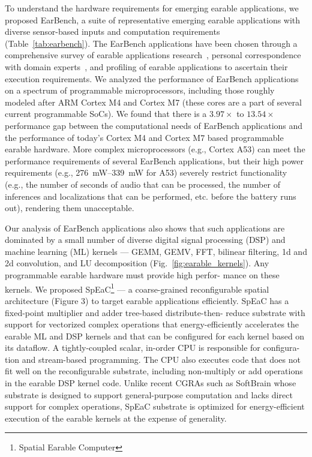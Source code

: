 To understand the hardware requirements for emerging earable applications, we
proposed EarBench, a suite of representative emerging earable applications with
diverse sensor-based inputs and computation requirements
(Table~\ref{tab:earbench}). The EarBench applications have been chosen through
a comprehensive survey of earable applications research~\cite{}, personal
correspondence with domain experts~\cite{}, and profiling of earable
applications to ascertain their execution requirements. We analyzed the
performance of EarBench applications on a spectrum of programmable
microprocessors, including those roughly modeled after ARM Cortex M4 and Cortex
M7 (these cores are a part of several current programmable SoCs). We found that
there is a \(3.97\times\) to \(13.54\times\) performance gap between the
computational needs of EarBench applications and the performance of today's
Cortex M4 and Cortex M7 based programmable earable hardware. More complex
microprocessors (e.g., Cortex A53) can meet the performance requirements of
several EarBench applications, but their high power requirements (e.g.,
\SIrange{276}{339}{\milli\watt} for A53) severely restrict functionality (e.g.,
the number of seconds of audio that can be processed, the number of inferences
and localizations that can be performed, etc. before the battery runs out),
rendering them unacceptable.

Our analysis of EarBench applications also shows that such applications are
dominated by a small number of diverse digital signal processing (DSP) and
machine learning (ML) kernels --- GEMM, GEMV, FFT, bilinear filtering, 1d and
2d convolution, and LU decomposition (Fig.~\ref{fig:earable_kernels}). Any
programmable earable hardware must provide high perfor- mance on these kernels.
We proposed SpEaC\footnote{Spatial Earable Computer} — a coarse-grained
reconfigurable spatial architecture (Figure 3) to target earable applications
efficiently. SpEaC has a fixed-point multiplier and adder tree-based
distribute-then- reduce substrate with support for vectorized complex
operations that energy-efficiently accelerates the earable ML and DSP kernels
and that can be configured for each kernel based on its dataflow. A
tightly-coupled scalar, in-order CPU is responsible for configura- tion and
stream-based programming. The CPU also executes code that does not fit well on
the reconfigurable substrate, including non-multiply or add operations in the
earable DSP kernel code. Unlike recent CGRAs such as SoftBrain\cite{} whose
substrate is designed to support general-purpose computation and lacks direct
support for complex operations, SpEaC substrate is optimized for
energy-efficient execution of the earable kernels at the expense of generality.

